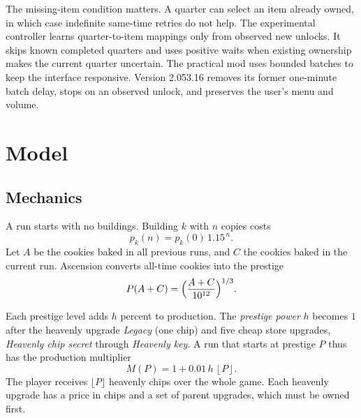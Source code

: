 \documentclass[11pt,a4paper]{article}
\numberwithin{equation}{section}
\theoremstyle{definition}
\theoremstyle{remark}
\newcommand{\floor}[1]{\left\lfloor#1\right\rfloor}
\begin{document}
The missing-item condition matters. A quarter can select an item already owned, in which case indefinite same-time retries do not help. The experimental controller learns quarter-to-item mappings only from observed new unlocks. It skips known completed quarters and uses positive waits when existing ownership makes the current quarter uncertain. The practical mod uses bounded batches to keep the interface responsive. Version 2.053.16 removes its former one-minute batch delay, stops on an observed unlock, and preserves the user's menu and volume.

\section{Model}\label{sec:model}
\subsection{Mechanics}\label{sec:mechanics}
A run starts with no buildings. Building $k$ with $n$ copies costs
\begin{equation}\label{eq:price}
 p_k(n)=p_k(0)\,1.15^{\,n}.
\end{equation}
Let $A$ be the cookies baked in all previous runs, and $C$ the cookies baked in the current run. Ascension converts all-time cookies into the prestige
\begin{equation}\label{eq:prestige}
 P(A+C)=\Bigl(\frac{A+C}{10^{12}}\Bigr)^{1/3}.
\end{equation}

Each prestige level adds $h$ percent to production. The \emph{prestige power} $h$ becomes $1$ after the heavenly upgrade \emph{Legacy} (one chip) and five cheap store upgrades, \emph{Heavenly chip secret} through \emph{Heavenly key}. A run that starts at prestige $P$ thus has the production multiplier
\begin{equation}\label{eq:multiplier}
 M(P)=1+0.01\,h\,\floor{P}.
\end{equation}
The player receives $\lfloor P\rfloor$ heavenly chips over the whole game. Each heavenly upgrade has a price in chips and a set of parent upgrades, which must be owned first.
\end{document}
